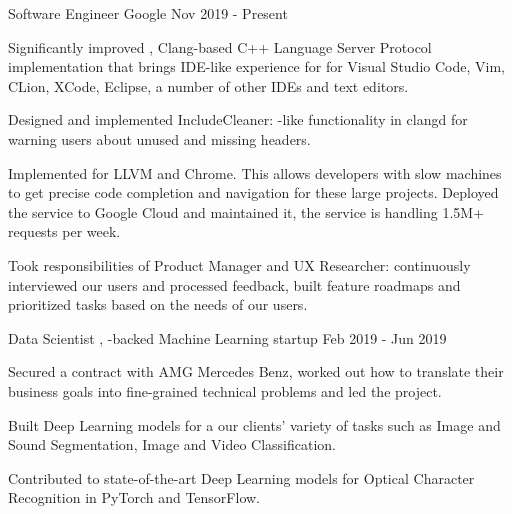 
\begin{cventries}

  \cventry
    {Software Engineer}
    {Google}
    {}
    {Nov 2019 - Present}
    {
      \begin{cvitems}
        \item Significantly improved ,
          Clang-based C++ Language Server Protocol implementation that brings
          IDE-like experience for for Visual Studio Code, Vim, CLion, XCode,
          Eclipse, a number of other IDEs and text editors.
        \item Designed and implemented IncludeCleaner:
          -like functionality in
          clangd for warning users about unused and missing headers.
        \item Implemented  for LLVM and Chrome. This
          allows developers with slow machines to get precise code completion
          and navigation for these large projects. Deployed the service to
          Google Cloud and maintained it, the service is handling 1.5M+ requests
          per week.
        \item Took responsibilities of Product Manager and UX Researcher:
          continuously interviewed our users and processed feedback, built
          feature roadmaps and prioritized tasks based on the needs of our
          users.
      \end{cvitems}
    }

  \cventry
    {Data Scientist}
    {,
     -backed Machine Learning
     startup}
    {}
    {Feb 2019 - Jun 2019}
    {
      \begin{cvitems}
        \item Secured a contract with AMG Mercedes Benz, worked out how to
          translate their business goals into fine-grained technical problems
          and led the project.
        \item Built Deep Learning models for a our clients' variety of tasks
          such as Image and Sound Segmentation, Image and Video Classification.
        \item Contributed to state-of-the-art Deep Learning models for Optical
          Character Recognition in PyTorch and TensorFlow.
      \end{cvitems}
    }


\end{cventries}
